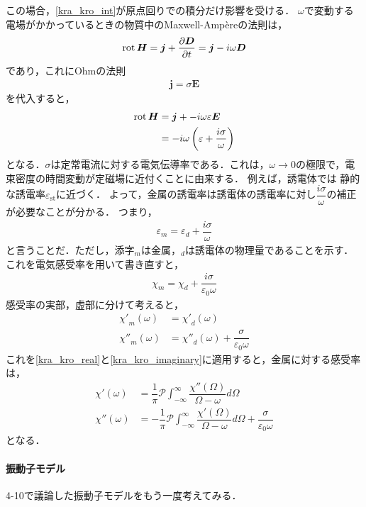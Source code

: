 この場合，\eqref{kra_kro_int}が原点回りでの積分だけ影響を受ける．
$\omega$で変動する電場がかかっているときの物質中のMaxwell-Amp\`ereの法則は，
\begin{align}
  \operatorname{rot} \boldsymbol{H} = \boldsymbol{j} + \dfrac{\partial\boldsymbol{D}}{\partial{t}} = \boldsymbol{j} - i\omega\boldsymbol{D}
\end{align}
であり，これにOhmの法則
\begin{align}
  \boldsymbol{j} = \sigma\boldsymbol{E}
\end{align}
を代入すると，
\begin{align}
  \operatorname{rot} \boldsymbol{H} &= \boldsymbol{j}+ - i\omega\varepsilon\boldsymbol{E}\notag\\
  &=  - i\omega\left(\varepsilon+\dfrac{i\sigma}{\omega}\right)
\end{align}
となる．$\sigma$は定常電流に対する電気伝導率である．これは，$\omega\to0$の極限で，電束密度の時間変動が定磁場に近付くことに由来する．
例えば，誘電体では 静的な誘電率$\varepsilon_{\text{st}}$に近づく．
よって，金属の誘電率は誘電体の誘電率に対し$\dfrac{i\sigma}{\omega}$の補正が必要なことが分かる．
つまり，
\begin{align}
  \varepsilon_{m} = \varepsilon_{d} + \dfrac{i\sigma}{\omega}
\end{align}
と言うことだ．ただし，添字$_m$は金属，$_d$は誘電体の物理量であることを示す．これを電気感受率を用いて書き直すと，
\begin{align}
  \chi_m=\chi_d+\dfrac{i\sigma}{\varepsilon_0\omega}
\end{align}
感受率の実部，虚部に分けて考えると，
\begin{align}
  {\chi'}_m(\omega) &= {\chi'}_d(\omega)\\
  {\chi''}_m(\omega) &= {\chi''}_d(\omega)+\dfrac{\sigma}{\varepsilon_0\omega}
\end{align}
これを\eqref{kra_kro_real}と\eqref{kra_kro_imaginary}に適用すると，金属に対する感受率は，
\begin{align}
  \chi'(\omega) &= \dfrac{1}{\pi}\mathcal{P}\int^\infty_{ - \infty}\dfrac{\chi''(\Omega)}{\Omega - \omega}d\Omega\\
  \chi''(\omega) &=  - \dfrac{1}{\pi}\mathcal{P}\int^\infty_{ - \infty}\dfrac{\chi'(\Omega)}{\Omega - \omega}d\Omega+\dfrac{\sigma}{\varepsilon_0\omega}\label{kra_kro_metalimg}
\end{align}
となる．

\paragraph{振動子モデル}
4-10で議論した振動子モデルをもう一度考えてみる．

